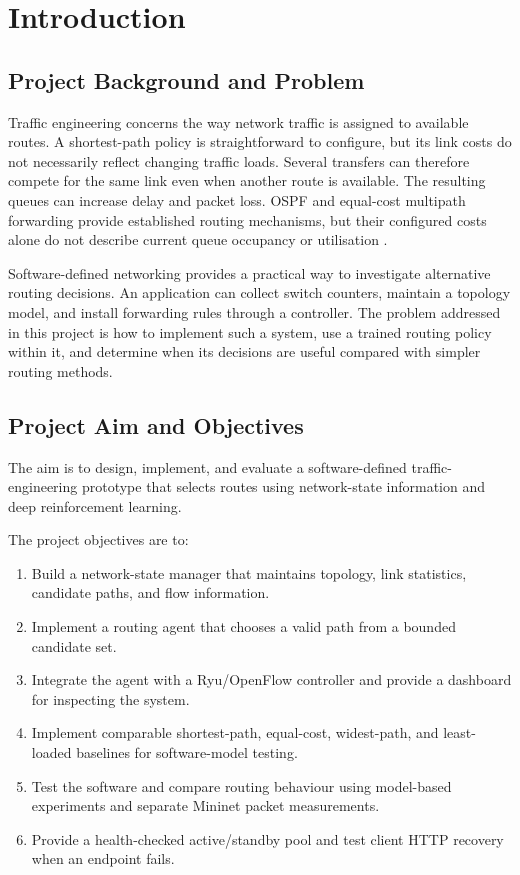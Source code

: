 \documentclass[12pt,a4paper,oneside]{report}
\let\cite\citep
\begin{document}
\clearpage
{}
\setcounter{page}{1}


\chapter{Introduction}
\label{chap:introduction}

\section{Project Background and Problem}
Traffic engineering concerns the way network traffic is assigned to available routes. A shortest-path policy is straightforward to configure, but its link costs do not necessarily reflect changing traffic loads. Several transfers can therefore compete for the same link even when another route is available. The resulting queues can increase delay and packet loss. OSPF and equal-cost multipath forwarding provide established routing mechanisms, but their configured costs alone do not describe current queue occupancy or utilisation \cite{moy1998ospf}.

Software-defined networking provides a practical way to investigate alternative routing decisions. An application can collect switch counters, maintain a topology model, and install forwarding rules through a controller. The problem addressed in this project is how to implement such a system, use a trained routing policy within it, and determine when its decisions are useful compared with simpler routing methods.

\section{Project Aim and Objectives}
\label{sec:aim_objectives}
The aim is to design, implement, and evaluate a software-defined traffic-engineering prototype that selects routes using network-state information and deep reinforcement learning.

The project objectives are to:
\begin{enumerate}
    \item Build a network-state manager that maintains topology, link statistics, candidate paths, and flow information.
    \item Implement a routing agent that chooses a valid path from a bounded candidate set.
    \item Integrate the agent with a Ryu/OpenFlow controller and provide a dashboard for inspecting the system.
    \item Implement comparable shortest-path, equal-cost, widest-path, and least-loaded baselines for software-model testing.
    \item Test the software and compare routing behaviour using model-based experiments and separate Mininet packet measurements.
    \item Provide a health-checked active/standby pool and test client HTTP recovery when an endpoint fails.
\end{enumerate}
\end{document}

